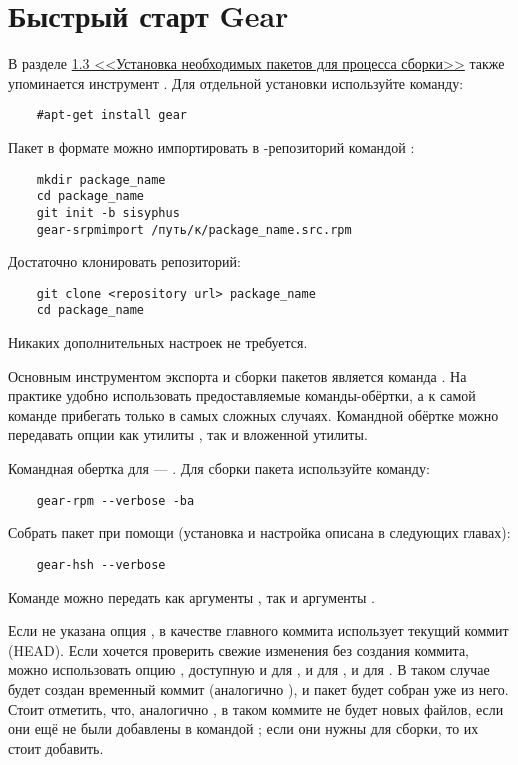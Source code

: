 \section{Быстрый старт Gear}

В разделе \hyperlink{1.3}{1.3 <<Установка необходимых пакетов для процесса сборки>>} 
также упоминается инструмент . Для отдельной установки используйте команду: 
\begin{verbatim}
	#apt-get install gear
\end{verbatim}


Пакет в формате  можно импортировать в -репозиторий командой :
\begin{verbatim}
	mkdir package_name
	cd package_name
	git init -b sisyphus
	gear-srpmimport /путь/к/package_name.src.rpm
\end{verbatim}


Достаточно клонировать репозиторий: 
\begin{verbatim}
	git clone <repository url> package_name
	cd package_name
\end{verbatim}

Никаких дополнительных настроек не требуется.


Основным инструментом экспорта и сборки пакетов является команда . На практике удобно 
использовать предоставляемые команды-обёртки, а к самой команде  прибегать только в 
самых сложных случаях. Командной обёртке можно передавать опции как утилиты , так и 
вложенной утилиты.

Командная обертка  для  --- . Для сборки пакета используйте команду: 
\begin{verbatim}
	gear-rpm --verbose -ba
\end{verbatim}


Собрать пакет при помощи  (установка и настройка  описана в следующих главах): 
\begin{verbatim}
	gear-hsh --verbose
\end{verbatim}

Команде  можно передать как аргументы , так и аргументы .

Если не указана опция ,  в качестве главного коммита использует текущий 
коммит (HEAD). Если хочется проверить свежие изменения без создания коммита, можно использовать опцию 
, доступную и для , и для , и для . В таком случае 
будет создан временный коммит (аналогично ), и пакет будет собран уже из него. 
Стоит отметить, что, аналогично , в таком коммите не будет новых файлов, если они 
ещё не были добавлены в  командой ; если они нужны для сборки, то их стоит добавить. 

